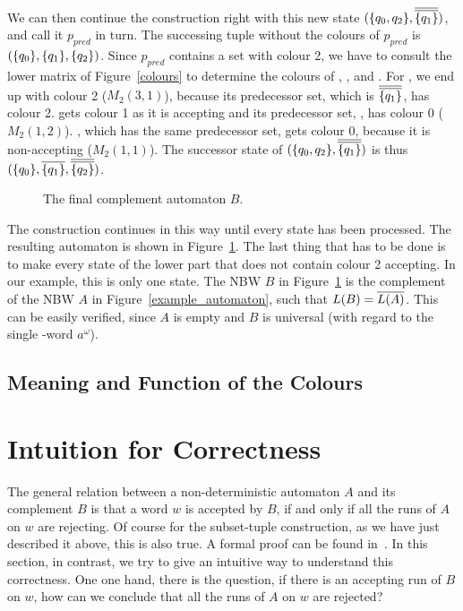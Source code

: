 We can then continue the construction right with this new state $(\qqm02,\cl2{\qm1})$, and call it $p_{pred}$ in turn. The successing tuple without the colours of $p_{pred}$ is $(\{q_{0}\},\{q_{1}\},\{q_{2}\})$. Since $p_{pred}$ contains a set with colour 2, we have to consult the lower matrix of Figure~\ref{colours} to determine the colours of , , and . For , we end up with colour 2 ($M_2(3,1)$), because its predecessor set, which is $\cl2{\qm1}$, has colour 2.  gets colour 1 as it is accepting and its predecessor set, , has colour 0 ($M_2(1,2)$). , which has the same predecessor set, gets colour 0, because it is non-accepting ($M_2(1,1)$). The successor state of $(\qqm02,\cl2{\qm1})$ is thus $(\qm0,\cl1{\qm1},\cl2{\qm2})$.

\begin{figure}
\begin{center}
\Complement
\caption{The final complement automaton $B$.}
\label{complement}
\end{center}
\end{figure} 

The construction continues in this way until every state has been processed. The resulting automaton is shown in Figure~\ref{complement}. The last thing that has to be done is to make every state of the lower part that does not contain colour 2 accepting. In our example, this is only one state. The NBW $B$ in Figure~\ref{complement} is the complement of the NBW $A$ in Figure~\ref{example_automaton}, such that $L(B) = \cl1{L(A)}$. This can be easily verified, since $A$ is empty and $B$ is universal (with regard to the single \om-word $a^\omega$).

\subsection{Meaning and Function of the Colours}


\section{Intuition for Correctness}
The general relation between a non-deterministic automaton $A$ and its complement $B$ is that a word $w$ is accepted by $B$, if and only if all the runs of $A$ on $w$ are rejecting. Of course for the subset-tuple construction, as we have just described it above, this is also true. A formal proof can be found in~\cite{2014_joel_ulrich}. In this section, in contrast, we try to give an intuitive way to understand this correctness. One one hand, there is the question, if there is an accepting run of $B$ on $w$, how can we conclude that all the runs of $A$ on $w$ are rejected?

